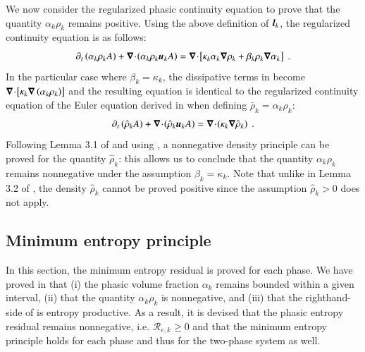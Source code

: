 We now consider the regularized phasic continuity equation to prove that the quantity $\alpha_k \rho_k$ remains positive. Using the above definition of $\boldsymbol l_k$, the regularized 
continuity equation is as follows:
%
\begin{equation}\label{eq:reg-mass-equ-final}
\partial_t \left( \alpha_k \rho_k A \right) + \boldsymbol\nabla\! \cdot \! \left( \alpha_k \rho_k \boldsymbol u_k A \right) = \boldsymbol\nabla\! \cdot \! \left[ \kappa_k \alpha_k \boldsymbol\nabla \rho_k + \beta_k \rho_k \boldsymbol\nabla \alpha_k \right] \ .
\end{equation}
%
In the particular case where $\beta_k = \kappa_k$, the dissipative terms in  become $\boldsymbol\nabla\! \cdot \! \left[ \kappa_k \boldsymbol\nabla \left( \alpha_k \rho_k \right) \right]$ and the
resulting equation is identical to the regularized continuity equation of the Euler equation derived in \cite{jlg} when defining $\bar{\rho}_k = \alpha_k \rho_k$:
%
\begin{equation}\label{eq:reg-euler-qu}
\partial_t \left( \hat{\rho}_k A \right) + \div \left( \hat{\rho}_k \mbold u_k A \right) = \div \left( \kappa_k \grad \hat{\rho}_k \right) \ .
\end{equation}
%
Following Lemma 3.1 of \cite{jlg} and using , a nonnegative density principle can be proved for the quantity $\hat{\rho}_k$: this allows us to conclude that the quantity $\alpha_k \rho_k$ remains nonnegative under the assumption $\beta_k = \kappa_k$. Note that unlike in Lemma 3.2 of \cite{jlg}, the density $\hat{\rho}_k$  cannot be proved positive since the assumption $\hat{\rho}_k > 0$ does not apply.

%
\subsection{Minimum entropy principle}\label{sct:end-min-pr}
%
In this section, the minimum entropy residual is proved for each phase. We have proved in  that (i) the phasic volume fraction $\alpha_k$ 
remains bounded within a given interval, 
(ii) that the quantity $\alpha_k \rho_k$ is nonnegative, and (iii) that 
the righthand-side of  is entropy productive. As a result, it is devised that the phasic entropy residual remains nonnegative, i.e. $\mathcal{R}_{e,k} \geq 0$
and that the minimum entropy principle holds for each phase and thus for the two-phase system as well.

